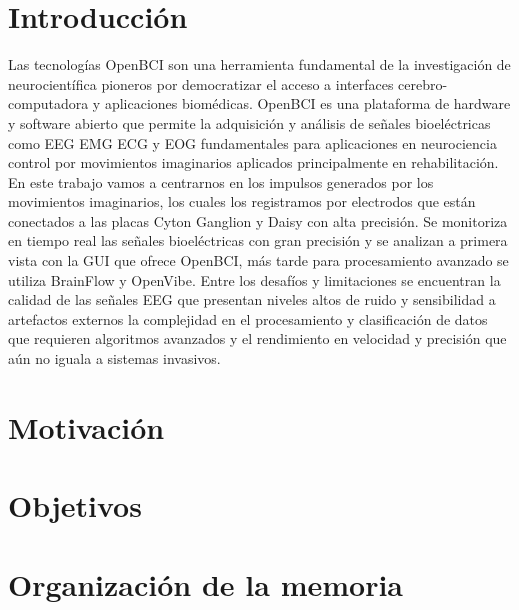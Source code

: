 
\section{Introducción}
Las tecnologías OpenBCI son una herramienta fundamental de la investigación de neurocientífica pioneros por 
democratizar el acceso a interfaces cerebro-computadora y aplicaciones biomédicas. 
OpenBCI es una plataforma de hardware y software abierto que permite la adquisición y análisis de señales bioeléctricas 
como EEG EMG ECG y EOG fundamentales para aplicaciones en neurociencia control por movimientos imaginarios aplicados principalmente en rehabilitación. 
En este trabajo vamos a centrarnos en los impulsos generados por los movimientos imaginarios, los cuales los registramos 
por electrodos que están conectados a las placas Cyton Ganglion y Daisy con alta precisión. 
Se monitoriza en tiempo real las señales bioeléctricas con gran precisión y se analizan a primera vista con la GUI que ofrece OpenBCI, 
más tarde para procesamiento avanzado se utiliza BrainFlow y OpenVibe.
Entre los desafíos y limitaciones se encuentran la calidad de las señales EEG que presentan niveles altos de ruido y sensibilidad a artefactos 
externos la complejidad en el procesamiento y clasificación de datos que requieren algoritmos avanzados y el rendimiento en velocidad y precisión que aún no iguala a sistemas invasivos.




\section{Motivación}


\section{Objetivos}


\section{Organización de la memoria}
